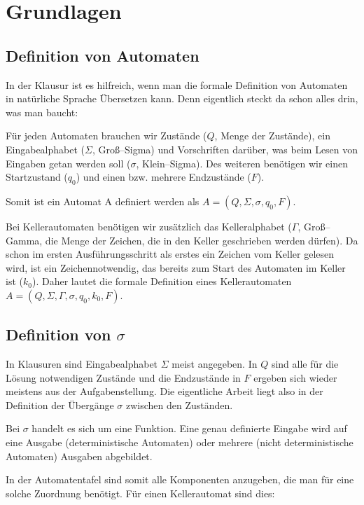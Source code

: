 \section{Grundlagen}
\label{sec:grundlagen}

\subsection{Definition von Automaten}

In der Klausur ist es hilfreich, wenn man die formale Definition von Automaten in natürliche Sprache Übersetzen kann. Denn eigentlich steckt da schon alles drin, was man baucht:

Für jeden Automaten brauchen wir Zustände ($Q$, Menge der Zustände), ein Eingabealphabet ($\Sigma$, Groß--Sigma) und Vorschriften darüber, was beim Lesen von Eingaben getan werden soll ($\sigma$, Klein--Sigma). Des weiteren benötigen wir einen Startzustand ($q_0$) und einen bzw. mehrere Endzustände ($F$). 

Somit ist ein Automat A definiert werden als $A=(Q,\Sigma, \sigma, q_0, F)$.

Bei Kellerautomaten benötigen wir zusätzlich das Kelleralphabet ($\Gamma$, Groß--Gamma, die Menge der Zeichen, die in den Keller geschrieben werden dürfen). Da schon im ersten Ausführungsschritt als erstes ein Zeichen vom Keller gelesen wird, ist ein Zeichennotwendig, das bereits zum Start des Automaten im Keller ist ($k_0$). Daher lautet die formale Definition eines Kellerautomaten $A=(Q,\Sigma, \Gamma, \sigma, q_0, k_0, F)$.

\subsection{Definition von $\sigma$}

In Klausuren sind Eingabealphabet $\Sigma$ meist angegeben. In $Q$ sind alle für die Lösung notwendigen Zustände und die Endzustände in $F$ ergeben sich wieder meistens aus der Aufgabenstellung. Die eigentliche Arbeit liegt also in der Definition der Übergänge $\sigma$ zwischen den Zuständen.

Bei $\sigma$ handelt es sich um eine Funktion. Eine genau definierte Eingabe wird auf eine Ausgabe (deterministische Automaten) oder mehrere (nicht deterministische Automaten) Ausgaben abgebildet.

In der Automatentafel sind somit alle Komponenten anzugeben, die man für eine solche Zuordnung benötigt.
Für einen Kellerautomat sind dies:

